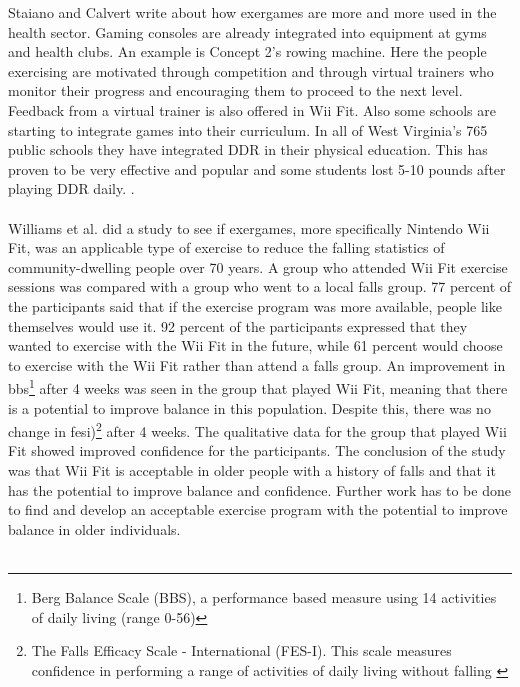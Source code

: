 Staiano and Calvert write about how exergames are more and more used in the health sector. Gaming consoles are already integrated into equipment at gyms and health clubs. An example is Concept 2’s rowing machine. Here the people exercising are motivated through competition and through virtual trainers who monitor their progress and encouraging them to proceed to the next level. Feedback from a virtual trainer is also offered in Wii Fit. Also some schools are starting to integrate games into their curriculum. In all of West Virginia’s 765 public schools they have integrated DDR in their physical education. This has proven to be very effective and popular and some students lost 5-10 pounds after playing DDR daily. \cite{staiano2011exergames}. \\ \\
Williams et al. did a study to see if exergames, more specifically Nintendo Wii Fit, was an applicable type of exercise to reduce the falling statistics of community-dwelling people over 70 years. A group who attended Wii Fit exercise sessions was compared with a group who went to a local falls group. 77 percent of the participants said that if the exercise program was more available, people like themselves would use it. 92 percent of the participants expressed that they wanted to exercise with the Wii Fit in the future, while 61 percent would choose to exercise with the Wii Fit rather than attend a falls group. An improvement in \ac{bbs}\footnote{Berg Balance Scale (BBS), a performance based measure using 14 activities of daily living (range 0-56)\cite{excell}} after 4 weeks was seen in the group that played Wii Fit, meaning that there is a potential to improve balance in this population. Despite this, there was no change in \ac{fesi})\footnote{The Falls Efficacy Scale - International (FES-I). This scale measures confidence in performing a range of activities of daily living without falling \cite{fes}} after 4 weeks. The qualitative data for the group that played Wii Fit showed improved confidence for the participants. The conclusion of the study was that Wii Fit is acceptable in  older people with a history of falls and that it has the potential to improve balance and confidence. Further work has to be done to find and develop an acceptable exercise program with the potential to improve balance in older individuals. \cite{excell}\\ \\
